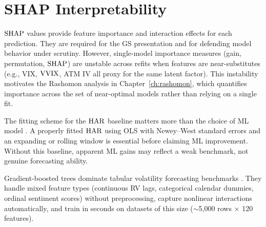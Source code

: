 \section{SHAP Interpretability}
\label{sec:shap}

$\operatorname{SHAP}$ values \citep{Lundberg2017} provide feature importance and interaction effects for each prediction.
They are required for the GS presentation and for defending model behavior under scrutiny.
However, single-model importance measures (gain, permutation, $\operatorname{SHAP}$) are unstable across refits when features are near-substitutes (e.g., VIX, $\operatorname{VVIX}$, ATM IV all proxy for the same latent factor).
This instability motivates the Rashomon analysis in Chapter~\ref{ch:rashomon}, which quantifies importance across the set of near-optimal models rather than relying on a single fit.



\begin{warning}
The fitting scheme for the $\operatorname{HAR}$ baseline matters more than the choice of ML model \citep{HARdToBeat2024}.
A properly fitted $\operatorname{HAR}$ using OLS with Newey--West standard errors and an expanding or rolling window is essential before claiming ML improvement.
Without this baseline, apparent ML gains may reflect a weak benchmark, not genuine forecasting ability.
\end{warning}

\begin{keyidea}
Gradient-boosted trees dominate tabular volatility forecasting benchmarks \citep{ChristensenSiggaardVeliyev2023, BrancoRubesamZevallos2024}.
They handle mixed feature types (continuous RV lags, categorical calendar dummies, ordinal sentiment scores) without preprocessing, capture nonlinear interactions automatically, and train in seconds on datasets of this size ($\sim$5{,}000 rows $\times$ 120 features).
\end{keyidea}
